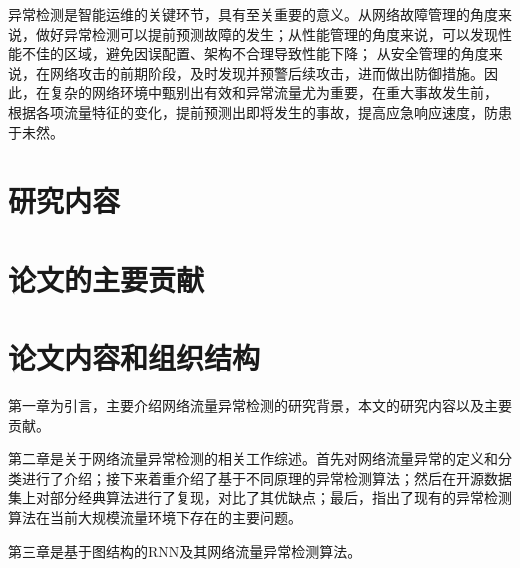 异常检测是智能运维的关键环节，具有至关重要的意义。从网络故障管理的角度来说，做好异常检测可以提前预测故障的发生；从性能管理的角度来说，可以发现性能不佳的区域，避免因误配置、架构不合理导致性能下降；
从安全管理的角度来说，在网络攻击的前期阶段，及时发现并预警后续攻击，进而做出防御措施。因此，在复杂的网络环境中甄别出有效和异常流量尤为重要，在重大事故发生前，
根据各项流量特征的变化，提前预测出即将发生的事故，提高应急响应速度，防患于未然。



\section{研究内容}

\section{论文的主要贡献}

\section{论文内容和组织结构}
第一章为引言，主要介绍网络流量异常检测的研究背景，本文的研究内容以及主要贡献。

第二章是关于网络流量异常检测的相关工作综述。首先对网络流量异常的定义和分类进行了介绍；接下来着重介绍了基于不同原理的异常检测算法；然后在开源数据集上对部分经典算法进行了复现，对比了其优缺点；最后，指出了现有的异常检测算法在当前大规模流量环境下存在的主要问题。

第三章是基于图结构的RNN及其网络流量异常检测算法。
